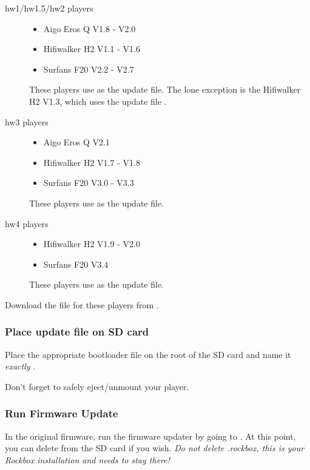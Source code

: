 \begin{description}
\item[hw1/hw1.5/hw2 players]
  \begin{itemize}
    \item Aigo Eros Q V1.8 - V2.0
    \item Hifiwalker H2 V1.1 - V1.6
    \item Surfans F20 V2.2 - V2.7
  \end{itemize}
  These players use  as the update file.
  The lone exception is the Hifiwalker H2 V1.3, which uses the update file
  .
\item[hw3 players]
  \begin{itemize}
    \item Aigo Eros Q V2.1
    \item Hifiwalker H2 V1.7 - V1.8
    \item Surfans F20 V3.0 - V3.3
  \end{itemize}
  These players use  as the update file.
\item[hw4 players]
  \begin{itemize}
    \item Hifiwalker H2 V1.9 - V2.0
    \item Surfans F20 V3.4
  \end{itemize}
  These players use  as the update file.
\end{description}

Download the  file for these players from .


\subsubsection{Place update file on SD card}\label{ref:place_on_sd_card}
Place the appropriate bootloader file on the root of the SD card and name it
\emph{exactly} .


Don't forget to safely eject/unmount your player.

\subsubsection{Run Firmware Update}\label{ref:run_firmware_update}
In the original firmware, run the firmware updater by going to
. At this point, you can delete
 from the SD card if you wish. \emph{Do not delete .rockbox,
this is your Rockbox installation and needs to stay there!}
